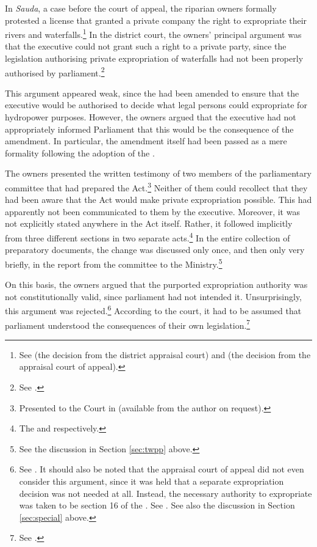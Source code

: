 In {\it Sauda}, a case before the court of appeal, the riparian owners formally protested a license that granted a private company the right to expropriate their rivers and waterfalls.\footnote{See \cite{sauda07} (the decision from the district appraisal court) and \cite{sauda09} (the decision from the appraisal court of appeal).} In the district court, the owners' principal argument was that the executive could not grant such a right to a private party, since the legislation authorising private expropriation of waterfalls had not been properly authorised by parliament.\footnote{See \cite{sauda07}.}

This argument appeared weak, since the \cite{ea59} had been amended to ensure that the executive would be authorised to decide what legal persons could expropriate for hydropower purposes. However, the owners argued that the executive had not appropriately informed Parliament that this would be the consequence of the amendment. In particular, the amendment itself had been passed as a mere formality following the adoption of the \cite{wra00}. 

The owners presented the written testimony of two members of the parliamentary committee that had prepared the Act.\footnote{Presented to the Court in \cite{sauda07} (available from the author on request).} Neither of them could recollect that they had been aware that the Act would make private expropriation possible. This had apparently not been communicated to them by the executive. Moreover, it was not explicitly stated anywhere in the Act itself. Rather, it followed implicitly from three different sections in two separate acts.\footnote{The \cite[51]{wra00} and \cite[2][3]{ea59} respectively.} In the entire collection of preparatory documents, the change was discussed only once, and then only very briefly, in the report from the committee to the Ministry.\footnote{See the discussion in Section \ref{sec:twpp} above.}

On this basis, the owners argued that the purported expropriation authority was not constitutionally valid, since parliament had not intended it. Unsurprisingly, this argument was rejected.\footnote{See \cite{sauda07}. It should also be noted that the appraisal court of appeal did not even consider this argument, since it was held that a separate expropriation decision was not needed at all. Instead, the necessary authority to expropriate was taken to be section 16 of the \cite{wra17}. See \cite{sauda09}. See also the discussion in Section \ref{sec:special} above.} According to the court, it had to be assumed that parliament understood the consequences of their own legislation.\footnote{See \cite{sauda07}.} 

